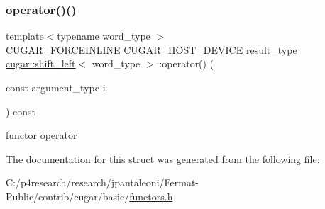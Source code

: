 \subsubsection{\texorpdfstring{operator()()}{operator()()}}
{\footnotesize\ttfamily template$<$typename word\+\_\+type $>$ \\
C\+U\+G\+A\+R\+\_\+\+F\+O\+R\+C\+E\+I\+N\+L\+I\+NE C\+U\+G\+A\+R\+\_\+\+H\+O\+S\+T\+\_\+\+D\+E\+V\+I\+CE result\+\_\+type \hyperlink{structcugar_1_1shift__left}{cugar\+::shift\+\_\+left}$<$ word\+\_\+type $>$\+::operator() (\begin{DoxyParamCaption}\item[{const argument\+\_\+type}]{i }\end{DoxyParamCaption}) const\hspace{0.3cm}{\ttfamily [inline]}}

functor operator 

The documentation for this struct was generated from the following file\+:\begin{DoxyCompactItemize}
\item 
C\+:/p4research/research/jpantaleoni/\+Fermat-\/\+Public/contrib/cugar/basic/\hyperlink{functors_8h}{functors.\+h}\end{DoxyCompactItemize}
